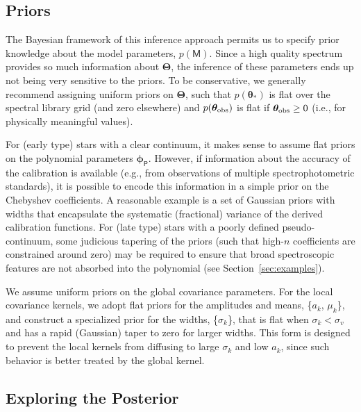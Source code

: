 \documentclass[iop,floatfix]{emulateapj}
\newcommand{\vM}{\mathsf{M}}
\newcommand{\vt}{ {\bm \theta}}
\newcommand{\vT}{ {\bm \Theta}}
\newcommand{\vp}{ {\bm \phi}}
\newcommand{\cheb}{ \vp_{\mathsf{P}}}
\begin{document}
\subsection{Priors} \label{subsec:priors}

The Bayesian framework of this inference approach permits us to specify prior knowledge about the 
model parameters, $p(\vM)$.  Since a high quality spectrum provides so much information about 
$\vT$, the inference of these parameters ends up not being very sensitive to the priors.  To be 
conservative, we generally recommend assigning uniform priors on $\vT$, such that $p(\vt_{\ast})$
is flat over the spectral library grid (and zero elsewhere) and $p(\vt_{\rm obs})$ is flat if 
$\vt_{\rm obs} \ge 0$ (i.e., for physically meaningful values).  

For (early type) stars with a clear continuum, it makes sense to assume flat priors on the 
polynomial parameters $\cheb$.  However, if information about the accuracy of the calibration is 
available (e.g., from observations of multiple spectrophotometric standards), it is possible to 
encode this information in a simple prior on the Chebyshev coefficients.  A reasonable example is a 
set of Gaussian priors with widths that encapsulate the systematic (fractional) variance of the 
derived calibration functions.  For (late type) stars with a poorly defined pseudo-continuum, 
some judicious tapering of the priors (such that high-$n$ coefficients are constrained around zero) 
may be required to ensure that broad spectroscopic features are not absorbed into the polynomial 
(see Section~\ref{sec:examples}). 

We assume uniform priors on the global covariance parameters.  For the local covariance kernels, we 
adopt flat priors for the amplitudes and means, \{$a_k$, $\mu_k$\}, and construct a specialized 
prior for the widths, \{$\sigma_k$\}, that is flat when $\sigma_k < \sigma_v$ and has a rapid 
(Gaussian) taper to zero for larger widths.  This form is designed to prevent the local 
kernels from diffusing to large $\sigma_k$ and low $a_k$, since such behavior is better treated by 
the global kernel.  


\subsection{Exploring the Posterior} \label{subsec:MCMC}
\end{document}
